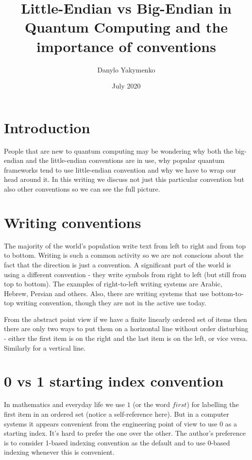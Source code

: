 \documentclass{article}
\title{Little-Endian vs Big-Endian in Quantum Computing and the importance of conventions}
\author{Danylo Yakymenko}
\date{July 2020}
\begin{document}
\maketitle

\section{Introduction}
People that are new to quantum computing may be wondering why both the big-endian and the little-endian conventions are in use, 
why popular quantum frameworks tend to use little-endian convention and why we have to wrap our head around it.
In this writing we discuss not just this particular convention but also other conventions so we can see the full picture. 

\section{Writing conventions}

The majority of the world's population write text from left to right and from top to bottom. 
Writing is such a common activity so we are not conscious about the fact that the direction is just a convention. 
A significant part of the world is using a different convention - they write symbols from right to left (but still from top to bottom). 
The examples of right-to-left writing systems are Arabic, Hebrew, Persian and others.
Also, there are writing systems that use bottom-to-top writing convention, though they are not in the active use today.

From the abstract point view if we have a finite linearly ordered set of items then there are only two ways to put them on a horizontal line without order disturbing - 
either the first item is on the right and the last item is on the left, or vice versa. Similarly for a vertical line.

\section{0 vs 1 starting index convention}
In mathematics and everyday life we use $1$ (or the word $\textit{first}$) for labelling the first item in an ordered set (notice a self-reference here). 
But in a computer systems it appears convenient from the engineering point of view to use $0$ as a starting index. 
It's hard to prefer the one over the other. 
The author's preference is to consider 1-based indexing convention as the default and to use 0-based indexing whenever this is convenient. 
\end{document}
